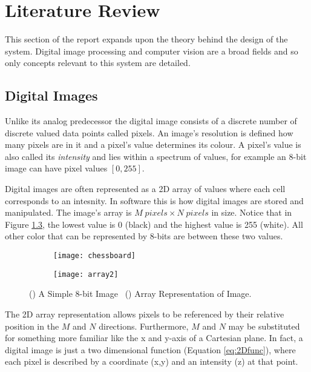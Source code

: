 \chapter{Literature Review}
This section of the report expands upon the theory behind the design of the system. Digital image processing and computer vision are a broad fields and so only concepts relevant to this system are detailed.

\section{Digital Images}
Unlike its analog predecessor the digital image consists of a discrete number of discrete valued data points called pixels. An image's resolution is defined how many pixels are in it and a pixel's value determines its colour. A pixel's value is also called its \emph{intensity} and lies within a spectrum of values, for example an 8-bit image can have pixel values $[0, 255]$. 

Digital images are often represented as a 2D array of values where each cell corresponds to an intesnity. In software this is how digital images are stored and manipulated. The image's array is $M\;pixels\times N\; pixels$ in size. Notice that in Figure \ref{fig:2Darray}, the lowest value is 0 (black) and the highest value is 255 (white). All other color that can be represented by 8-bits are between these two values.

\begin{figure}[ht!]
    \centering
    \begin{subfigure}[b]{0.5\linewidth}
      \centering\texttt{[image: chessboard]}
      \caption{\label{fig:fig1}}
    \end{subfigure}%
    \begin{subfigure}[b]{0.5\linewidth}
      \centering\texttt{[image: array2]}
      \caption{\label{fig:fig2}}
    \end{subfigure}
    \caption{() A Simple 8-bit Image ~() Array Representation of Image.}
    \label{fig:2Darray}

\end{figure}
  

The 2D array representation allows pixels to be referenced by their relative position in the $M$ and $N$ directions. Furthermore, $M$ and $N$ may be substituted for something more familiar like the x and y-axis of a Cartesian plane. In fact, a digital image is just a two dimensional function (Equation \ref{eq:2Dfunc}), where each pixel is described by a coordinate (x,y) and an intensity (z) at that point.

